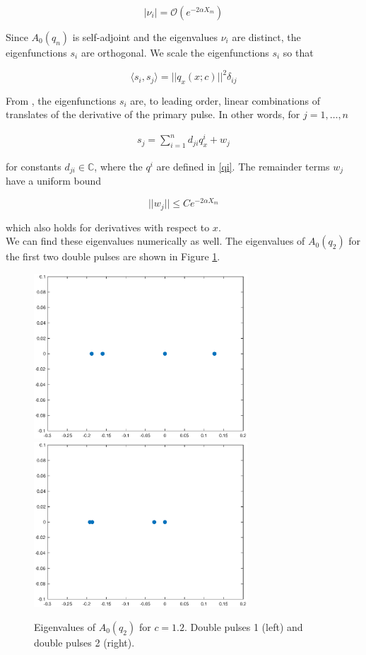 \documentclass[12pt]{article}
\def\C{{\mathbb C}}
\begin{document}
\begin{equation}
|\nu_i| = \mathcal{O}(e^{-2 \alpha X_m})
\end{equation}

Since $A_0(q_n)$ is self-adjoint and the eigenvalues $\nu_i$ are distinct, the eigenfunctions $s_i$ are orthogonal. We scale the eigenfunctions $s_i$ so that

\begin{equation}\label{orthonormaleigs}
\langle s_i, s_j \rangle = ||q_x(x; c)||^2 \delta_{ij}
\end{equation}

From \cite{Sandstede1998}, the eigenfunctions $s_i$ are, to leading order, linear combinations of translates of the derivative of the primary pulse. In other words, for $j = 1, \dots, n$

\begin{align}\label{sj}
s_j = \sum_{i = 1}^{n} d_{ji} q^i_x + w_j
\end{align}

for constants $d_{ji} \in \C$, where the $q^i$ are defined in \eqref{qi}. The remainder terms $w_j$ have a uniform bound

\begin{equation}\label{sjwbound}
||w_j|| \leq C e^{-2 \alpha X_m}
\end{equation}

which also holds for derivatives with respect to $x$.\\

We can find these eigenvalues numerically as well. The eigenvalues of $A_0(q_2)$ for the first two double pulses are shown in Figure \ref{fig:specA0double}.

\begin{figure}[H]
\label{fig:specA0double}
\centering
\includegraphics[width=8cm]{specA0d1}
\includegraphics[width=8cm]{specA0d2}
\caption{Eigenvalues of $A_0(q_2)$ for $c = 1.2$. Double pulses 1 (left) and double pulses 2 (right).}
\end{figure}
\end{document}
